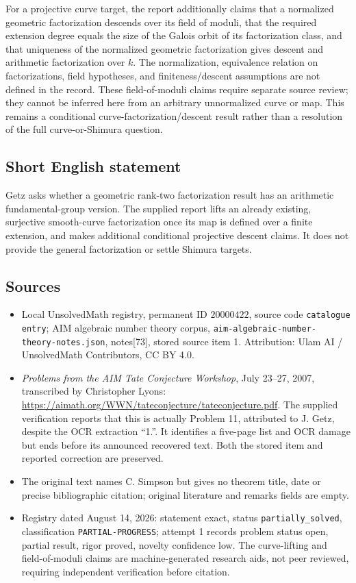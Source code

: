 \documentclass[11pt]{article}
\begin{document}
For a projective curve target, the report additionally claims that a normalized geometric factorization descends over its field of moduli, that the required extension degree equals the size of the Galois orbit of its factorization class, and that uniqueness of the normalized geometric factorization gives descent and arithmetic factorization over \(k\). The normalization, equivalence relation on factorizations, field hypotheses, and finiteness/descent assumptions are not defined in the record. These field-of-moduli claims require separate source review; they cannot be inferred here from an arbitrary unnormalized curve or map. This remains a conditional curve-factorization/descent result rather than a resolution of the full curve-or-Shimura question.
\subsection{Short English statement}
Getz asks whether a geometric rank-two factorization result has an arithmetic fundamental-group version. The supplied report lifts an already existing, surjective smooth-curve factorization once its map is defined over a finite extension, and makes additional conditional projective descent claims. It does not provide the general factorization or settle Shimura targets.
\subsection{Sources}
\begin{itemize}
\item Local UnsolvedMath registry, permanent ID \(20000422\), source code \texttt{catalogue entry}; AIM algebraic number theory corpus, \texttt{aim-algebraic-number-theory-notes.json}, notes[73], stored source item 1. Attribution: Ulam AI / UnsolvedMath Contributors, CC BY 4.0.
\item \emph{Problems from the AIM Tate Conjecture Workshop}, July 23--27, 2007, transcribed by Christopher Lyons: \url{https://aimath.org/WWN/tateconjecture/tateconjecture.pdf}. The supplied verification reports that this is actually Problem 11, attributed to J. Getz, despite the OCR extraction ``1.''. It identifies a five-page list and OCR damage but ends before its announced recovered text. Both the stored item and reported correction are preserved.
\item The original text names C. Simpson but gives no theorem title, date or precise bibliographic citation; original literature and remarks fields are empty.
\item Registry dated August 14, 2026: statement exact, status \texttt{partially\_solved}, classification \texttt{PARTIAL-PROGRESS}; attempt 1 records problem status open, partial result, rigor proved, novelty confidence low. The curve-lifting and field-of-moduli claims are machine-generated research aids, not peer reviewed, requiring independent verification before citation.
\end{itemize}
\end{document}
